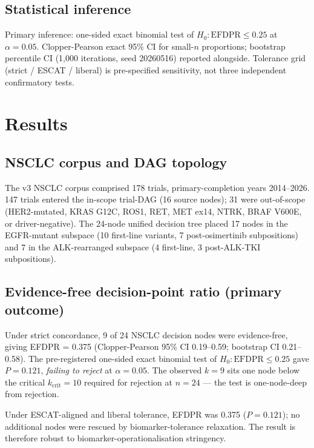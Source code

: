 \documentclass[11pt,a4paper]{article}
\begin{document}
\subsection{Statistical inference}
Primary inference: one-sided exact binomial test of $H_0: \mathrm{EFDPR} \le 0.25$ at $\alpha = 0.05$. Clopper-Pearson exact 95\% CI\citep{clopper1934} for small-$n$ proportions; bootstrap percentile CI\citep{efron1979bootstrap} (1,000 iterations, seed 20260516) reported alongside. Tolerance grid (strict / ESCAT / liberal) is pre-specified sensitivity, not three independent confirmatory tests.

\section{Results}\label{sec:results}

\subsection{NSCLC corpus and DAG topology}
The v3 NSCLC corpus comprised 178 trials, primary-completion years 2014--2026. 147 trials entered the in-scope trial-DAG (16 source nodes); 31 were out-of-scope (HER2-mutated, KRAS G12C, ROS1, RET, MET ex14, NTRK, BRAF V600E, or driver-negative). The 24-node unified decision tree placed 17 nodes in the EGFR-mutant subspace (10 first-line variants, 7 post-osimertinib subpositions) and 7 in the ALK-rearranged subspace (4 first-line, 3 post-ALK-TKI subpositions).

\subsection{Evidence-free decision-point ratio (primary outcome)}
Under strict concordance, 9 of 24 NSCLC decision nodes were evidence-free, giving EFDPR = 0.375 (Clopper-Pearson 95\% CI 0.19--0.59; bootstrap CI 0.21--0.58). The pre-registered one-sided exact binomial test of $H_0: \mathrm{EFDPR} \le 0.25$ gave $P = 0.121$, \emph{failing to reject} at $\alpha = 0.05$. The observed $k = 9$ sits one node below the critical $k_{\mathrm{crit}} = 10$ required for rejection at $n = 24$ --- the test is one-node-deep from rejection.

Under ESCAT-aligned and liberal tolerance, EFDPR was 0.375 ($P = 0.121$); no additional nodes were rescued by biomarker-tolerance relaxation. The result is therefore robust to biomarker-operationalisation stringency.
\end{document}
